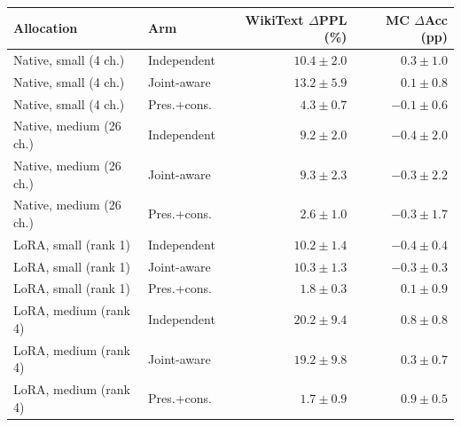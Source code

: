 \begin{tabular}{@{}llrr@{}}
\toprule
Allocation & Arm & WikiText $\Delta$PPL (\%) & MC $\Delta$Acc (pp)\\
\midrule
Native, small (4 ch.) & Independent & $10.4 \pm 2.0$ & $0.3 \pm 1.0$\\
Native, small (4 ch.) & Joint-aware & $13.2 \pm 5.9$ & $0.1 \pm 0.8$\\
Native, small (4 ch.) & Pres.+cons. & $4.3 \pm 0.7$ & $-0.1 \pm 0.6$\\
\midrule
Native, medium (26 ch.) & Independent & $9.2 \pm 2.0$ & $-0.4 \pm 2.0$\\
Native, medium (26 ch.) & Joint-aware & $9.3 \pm 2.3$ & $-0.3 \pm 2.2$\\
Native, medium (26 ch.) & Pres.+cons. & $2.6 \pm 1.0$ & $-0.3 \pm 1.7$\\
\midrule
LoRA, small (rank 1) & Independent & $10.2 \pm 1.4$ & $-0.4 \pm 0.4$\\
LoRA, small (rank 1) & Joint-aware & $10.3 \pm 1.3$ & $-0.3 \pm 0.3$\\
LoRA, small (rank 1) & Pres.+cons. & $1.8 \pm 0.3$ & $0.1 \pm 0.9$\\
\midrule
LoRA, medium (rank 4) & Independent & $20.2 \pm 9.4$ & $0.8 \pm 0.8$\\
LoRA, medium (rank 4) & Joint-aware & $19.2 \pm 9.8$ & $0.3 \pm 0.7$\\
LoRA, medium (rank 4) & Pres.+cons. & $1.7 \pm 0.9$ & $0.9 \pm 0.5$\\
\bottomrule
\end{tabular}
